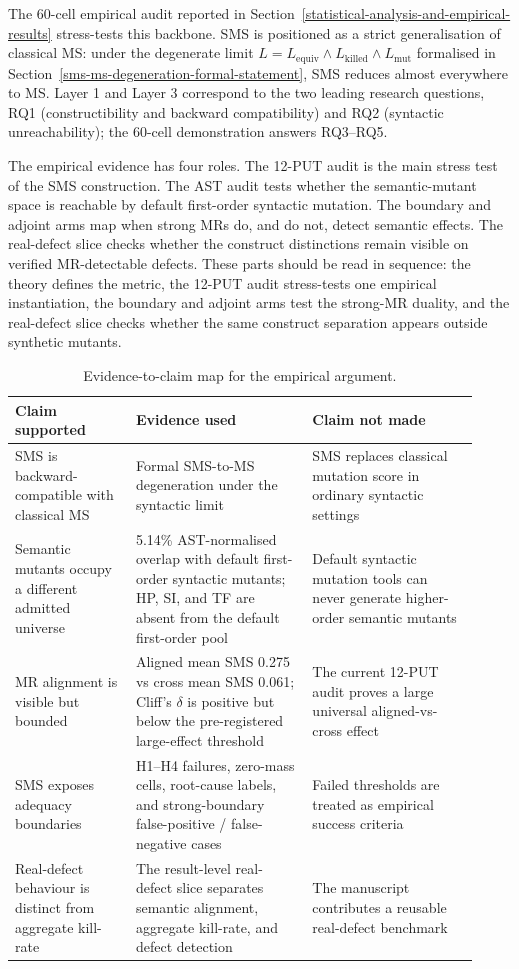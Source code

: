 \documentclass[12pt]{article}
\begin{document}
The 60-cell empirical audit reported in Section~\ref{statistical-analysis-and-empirical-results} stress-tests this
backbone. SMS is positioned as a strict generalisation of classical MS:
under the
degenerate limit $L = L_{\mathrm{equiv}} \wedge L_{\mathrm{killed}} \wedge L_{\mathrm{mut}}$
formalised in Section~\ref{sms-ms-degeneration-formal-statement}, SMS reduces almost everywhere to MS. Layer 1 and
Layer 3 correspond to the two leading research questions, RQ1
(constructibility and backward compatibility) and RQ2 (syntactic
unreachability); the 60-cell demonstration answers RQ3--RQ5.

The empirical evidence has four roles. The 12-PUT audit is the main
stress test of the SMS construction. The AST audit tests whether the
semantic-mutant space is reachable by default first-order syntactic
mutation. The boundary and adjoint arms map when strong MRs do, and do
not, detect semantic effects. The real-defect slice checks whether the
construct distinctions remain visible on verified MR-detectable defects.
These parts should be read in sequence: the theory defines the metric,
the 12-PUT audit stress-tests one empirical instantiation, the boundary
and adjoint arms test the strong-MR duality, and the real-defect slice
checks whether the same construct separation appears outside synthetic
mutants.

\begin{table}[t]
\caption{Evidence-to-claim map for the empirical argument.}
\label{tab:claim-evidence-map}
\centering
\small
\begin{tabular}{p{0.24\linewidth}p{0.35\linewidth}p{0.33\linewidth}}
\toprule
Claim supported & Evidence used & Claim not made \\
\midrule
SMS is backward-compatible with classical MS & Formal SMS-to-MS
degeneration under the syntactic limit & SMS replaces classical mutation
score in ordinary syntactic settings \\
Semantic mutants occupy a different admitted universe & 5.14\%
AST-normalised overlap with default first-order syntactic mutants;
HP, SI, and TF are absent from the default first-order pool & Default
syntactic mutation tools can never generate higher-order semantic
mutants \\
MR alignment is visible but bounded & Aligned mean SMS 0.275 vs
cross mean SMS 0.061; Cliff's \(\delta\) is positive but below the
pre-registered large-effect threshold & The current 12-PUT audit proves
a large universal aligned-vs-cross effect \\
SMS exposes adequacy boundaries & H1--H4 failures, zero-mass cells,
root-cause labels, and strong-boundary false-positive / false-negative
cases & Failed thresholds are treated as empirical success criteria \\
Real-defect behaviour is distinct from aggregate kill-rate & The
result-level real-defect slice separates semantic alignment, aggregate
kill-rate, and defect detection & The manuscript contributes a reusable
real-defect benchmark \\
\bottomrule
\end{tabular}
\normalsize
\end{table}
\end{document}
